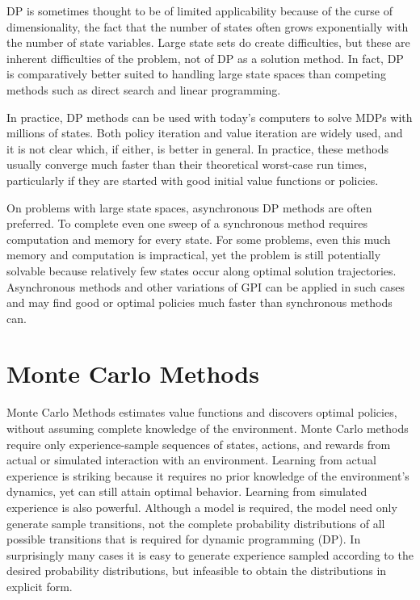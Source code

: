 \documentclass{article}
\begin{document}
DP is sometimes thought to be of limited applicability because of the curse of dimensionality, the fact that the number of states often grows exponentially with the number of state variables. 
Large state sets do create difficulties, but these are inherent difficulties of the problem, not of DP as a solution method. In fact, DP is comparatively better suited to handling large state spaces than competing methods such as direct search and linear programming.

In practice, DP methods can be used with today's computers to solve MDPs with millions of states. Both policy iteration and value iteration are widely used, and it is not clear which, if either, is better in general. 
In practice, these methods usually converge much faster than their theoretical worst-case run times, particularly if they are started with good initial value functions or policies.

On problems with large state spaces, asynchronous DP methods are often preferred. To complete even one sweep of a synchronous method requires computation and memory for every state. 
For some problems, even this much memory and computation is impractical, yet the problem is still potentially solvable because relatively few states occur along optimal solution trajectories. 
Asynchronous methods and other variations of GPI can be applied in such cases and may find good or optimal policies much faster than synchronous methods can.

\section{Monte Carlo Methods}

Monte Carlo Methods estimates value functions and discovers optimal policies, without assuming complete knowledge of the environment. 
Monte Carlo methods require only experience-sample sequences of states, actions, and rewards from actual or simulated interaction with an environment. 
Learning from actual experience is striking because it requires no prior knowledge of the environment's dynamics, yet can still attain optimal behavior. 
Learning from simulated experience is also powerful. Although a model is required, the model need only generate sample transitions, 
not the complete probability distributions of all possible transitions that is required for dynamic programming (DP). 
In surprisingly many cases it is easy to generate experience sampled according to the desired probability distributions, 
but infeasible to obtain the distributions in explicit form.
\end{document}
